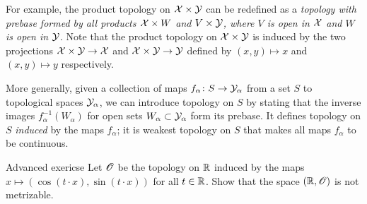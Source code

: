 For example, the product topology on $\mathcal{X}\times\mathcal{Y}$ can be redefined as a \textit{topology with prebase formed by all products $\mathcal{X}\times W$ and $V\times \mathcal{Y}$, where $V$ is open in $\mathcal{X}$ and $W$ is open in $\mathcal{Y}$}.
Note that the product topology on $\mathcal{X}\times\mathcal{Y}$ is induced by the two projections $\mathcal{X}\times\mathcal{Y}\to \mathcal{X}$ and $\mathcal{X}\times\mathcal{Y}\to \mathcal{Y}$ defined by $(x,y)\mapsto x$ and $(x,y)\mapsto y$ respectively.

More generally, given a collection of maps $f_\alpha\colon S\to \mathcal{Y}_\alpha$ from a set $S$ to topological spaces $\mathcal{Y}_\alpha$, we can introduce topology on $S$ by stating that the inverse images $f^{-1}_\alpha(W_\alpha)$ for open sets $W_\alpha\subset\mathcal{Y}_\alpha$ form its prebase.
It defines topology on $S$ \emph{induced} by the maps $f_\alpha$;
it is weakest topology on $S$ that makes all maps $f_\alpha$ to be continuous.

\begin{thm}{Advanced exericse}\label{ex:induced-nonmetrizable}
Let $\mathscr{O}$ be the topology on $\mathbb{R}$ induced by the maps $x\mapsto (\cos(t\cdot x),\sin(t\cdot x))$ for all $t\in \mathbb{R}$.
Show that the space $(\mathbb{R},\mathscr{O})$ is not metrizable.
\end{thm}

